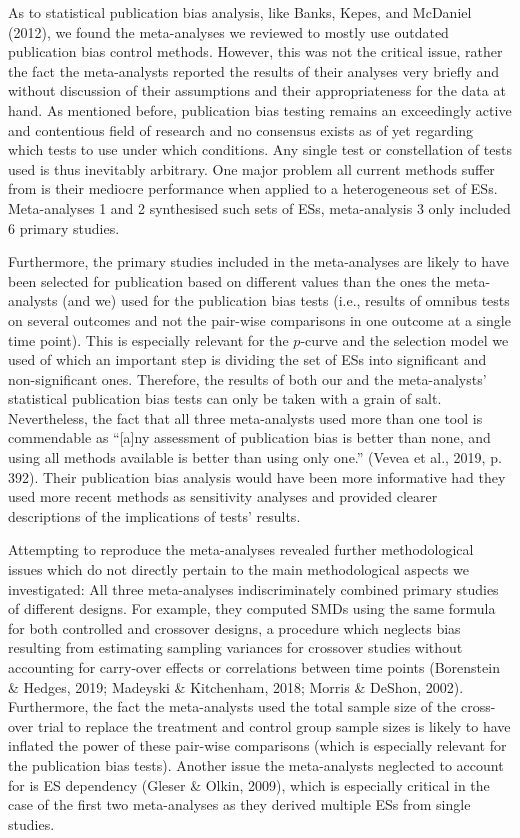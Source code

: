 \documentclass[
  man,floatsintext]{apa6}
\begin{document}
As to statistical publication bias analysis, like Banks, Kepes, and McDaniel (2012), we found the meta-analyses we reviewed to mostly use outdated publication bias control methods. However, this was not the critical issue, rather the fact the meta-analysts reported the results of their analyses very briefly and without discussion of their assumptions and their appropriateness for the data at hand. As mentioned before, publication bias testing remains an exceedingly active and contentious field of research and no consensus exists as of yet regarding which tests to use under which conditions. Any single test or constellation of tests used is thus inevitably arbitrary. One major problem all current methods suffer from is their mediocre performance when applied to a heterogeneous set of ESs. Meta-analyses 1 and 2 synthesised such sets of ESs, meta-analysis 3 only included 6 primary studies.

Furthermore, the primary studies included in the meta-analyses are likely to have been selected for publication based on different values than the ones the meta-analysts (and we) used for the publication bias tests (i.e., results of omnibus tests on several outcomes and not the pair-wise comparisons in one outcome at a single time point). This is especially relevant for the \(p\)-curve and the selection model we used of which an important step is dividing the set of ESs into significant and non-significant ones. Therefore, the results of both our and the meta-analysts' statistical publication bias tests can only be taken with a grain of salt. Nevertheless, the fact that all three meta-analysts used more than one tool is commendable as ``{[}a{]}ny assessment of publication bias is better than none, and using all methods available is better than using only one.'' (Vevea et al., 2019, p. 392). Their publication bias analysis would have been more informative had they used more recent methods as sensitivity analyses and provided clearer descriptions of the implications of tests' results.

Attempting to reproduce the meta-analyses revealed further methodological issues which do not directly pertain to the main methodological aspects we investigated: All three meta-analyses indiscriminately combined primary studies of different designs. For example, they computed SMDs using the same formula for both controlled and crossover designs, a procedure which neglects bias resulting from estimating sampling variances for crossover studies without accounting for carry-over effects or correlations between time points (Borenstein \& Hedges, 2019; Madeyski \& Kitchenham, 2018; Morris \& DeShon, 2002). Furthermore, the fact the meta-analysts used the total sample size of the cross-over trial to replace the treatment and control group sample sizes is likely to have inflated the power of these pair-wise comparisons (which is especially relevant for the publication bias tests). Another issue the meta-analysts neglected to account for is ES dependency (Gleser \& Olkin, 2009), which is especially critical in the case of the first two meta-analyses as they derived multiple ESs from single studies.
\end{document}

